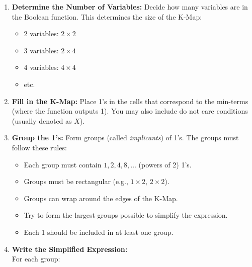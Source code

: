 \begin{enumerate}
	
	\item \textbf{Determine the Number of Variables:} Decide how many variables are in the 
		   Boolean function. This determines the size of the K-Map:
	      
		\begin{itemize}
		 
			\item 2 variables: \(2 \times 2\)
		 	
			\item 3 variables: \(2 \times 4\)
		 
			\item 4 variables: \(4 \times 4\)
		 
			\item etc.
	  
		\end{itemize}

	\item \textbf{Fill in the K-Map:} Place 1's in the cells that correspond to the min-terms 
		  (where the function outputs 1). You may also include do not care conditions 
		  (usually denoted as \(X\)).

	\item \textbf{Group the 1's:} Form groups (called \emph{implicants}) of 1's. 
		   The groups must follow these rules:
	      
		\begin{itemize}
		 
			\item Each group must contain \(1, 2, 4, 8, \ldots\) (powers of 2) 1's.
		 
			\item Groups must be rectangular (e.g., \(1 \times 2\), \(2 \times 2\)).
		 
			\item Groups can wrap around the edges of the K-Map.
		 
			\item Try to form the largest groups possible to simplify the expression.
		 
			\item Each 1 should be included in at least one group.
	 
		\end{itemize}

	\item \textbf{Write the Simplified Expression:} \\
	      For each group:


\end{enumerate}
